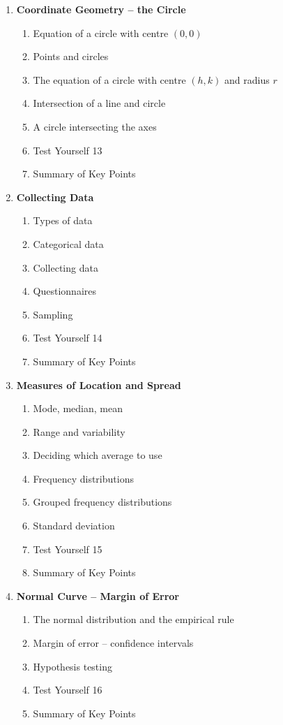 \documentclass{article}
\begin{document}
\begin{enumerate}
    \item \textbf{Coordinate Geometry – the Circle}
    \begin{enumerate}
        \item Equation of a circle with centre $(0, 0)$
        \item Points and circles
        \item The equation of a circle with centre $(h, k)$ and radius $r$
        \item Intersection of a line and circle
        \item A circle intersecting the axes
        \item Test Yourself 13
        \item Summary of Key Points
    \end{enumerate}

    \item \textbf{Collecting Data}
    \begin{enumerate}
        \item Types of data
        \item Categorical data
        \item Collecting data
        \item Questionnaires
        \item Sampling
        \item Test Yourself 14
        \item Summary of Key Points
    \end{enumerate}

    \item \textbf{Measures of Location and Spread}
    \begin{enumerate}
        \item Mode, median, mean
        \item Range and variability
        \item Deciding which average to use
        \item Frequency distributions
        \item Grouped frequency distributions
        \item Standard deviation
        \item Test Yourself 15
        \item Summary of Key Points
    \end{enumerate}

    \item \textbf{Normal Curve – Margin of Error}
    \begin{enumerate}
        \item The normal distribution and the empirical rule
        \item Margin of error – confidence intervals
        \item Hypothesis testing
        \item Test Yourself 16
        \item Summary of Key Points
    \end{enumerate}


\end{enumerate}
\end{document}
